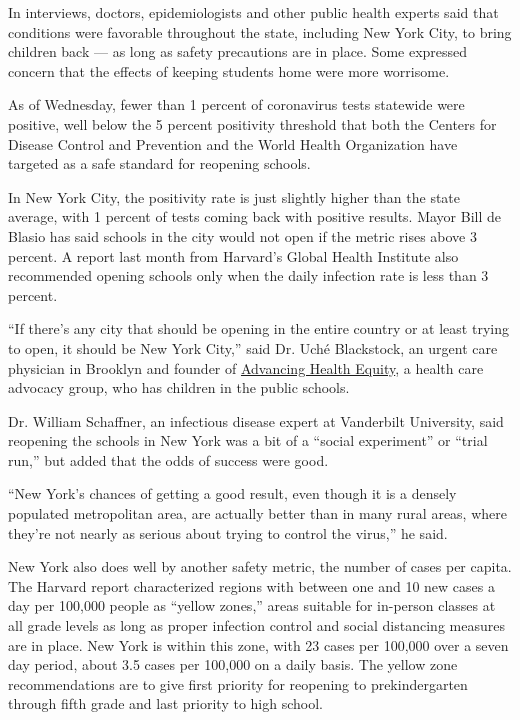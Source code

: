 In interviews, doctors, epidemiologists and other public health experts
said that conditions were favorable throughout the state, including New
York City, to bring children back --- as long as safety precautions are
in place. Some expressed concern that the effects of keeping students
home were more worrisome.

As of Wednesday, fewer than 1 percent of coronavirus tests statewide
were positive, well below the 5 percent positivity threshold that both
the Centers for Disease Control and Prevention and the World Health
Organization have targeted as a safe standard for reopening schools.

In New York City, the positivity rate is just slightly higher than the
state average, with 1 percent of tests coming back with positive
results. Mayor Bill de Blasio has said schools in the city would not
open if the metric rises above 3 percent. A report last month from
Harvard's Global Health Institute also recommended opening schools only
when the daily infection rate is less than 3 percent.

``If there's any city that should be opening in the entire country or at
least trying to open, it should be New York City,'' said Dr. Uché
Blackstock, an urgent care physician in Brooklyn and founder of
\href{https://advancinghealthequity.com/}{Advancing Health Equity}, a
health care advocacy group, who has children in the public schools.

Dr. William Schaffner, an infectious disease expert at Vanderbilt
University, said reopening the schools in New York was a bit of a
``social experiment'' or ``trial run,'' but added that the odds of
success were good.

``New York's chances of getting a good result, even though it is a
densely populated metropolitan area, are actually better than in many
rural areas, where they're not nearly as serious about trying to control
the virus,'' he said.

New York also does well by another safety metric, the number of cases
per capita. The Harvard report characterized regions with between one
and 10 new cases a day per 100,000 people as ``yellow zones,'' areas
suitable for in-person classes at all grade levels as long as proper
infection control and social distancing measures are in place. New York
is within this zone, with 23 cases per 100,000 over a seven day period,
about 3.5 cases per 100,000 on a daily basis. The yellow zone
recommendations are to give first priority for reopening to
prekindergarten through fifth grade and last priority to high school.

